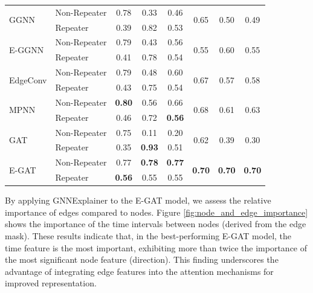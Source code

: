 \documentclass[journal]{IEEEtran}
\begin{document}
\begin{table}[htbp]
{\begin{tabular}{l l | c c c | c c c}
            \multirow{2}{*}{GGNN} 
                & Non-Repeater    & 0.78 & 0.33 & 0.46 & \multirow{2}{*}{0.65} & \multirow{2}{*}{0.50} & \multirow{2}{*}{0.49} \\
                & Repeater        & 0.39 & 0.82 & 0.53 &  &  &  \\
            \midrule
            \multirow{2}{*}{E-GGNN} 
                & Non-Repeater    & 0.79 & 0.43 & 0.56 & \multirow{2}{*}{0.55} & \multirow{2}{*}{0.60} & \multirow{2}{*}{0.55} \\
                & Repeater        & 0.41 & 0.78 & 0.54 &  &  &  \\
            \midrule 
            \multirow{2}{*}{EdgeConv} 
                & Non-Repeater    & 0.79 & 0.48 & 0.60 & \multirow{2}{*}{0.67} & \multirow{2}{*}{0.57} & \multirow{2}{*}{0.58} \\
                & Repeater        & 0.43 & 0.75 & 0.54 &  &  &  \\
            \midrule
            \multirow{2}{*}{MPNN} 
                & Non-Repeater    & \textbf{0.80} & 0.56 & 0.66 & \multirow{2}{*}{0.68} & \multirow{2}{*}{0.61} & \multirow{2}{*}{0.63} \\
                & Repeater        & 0.46 & 0.72 & \textbf{0.56} &  &  &  \\
            \midrule
            \multirow{2}{*}{GAT} 
                & Non-Repeater    & 0.75 & 0.11 & 0.20 & \multirow{2}{*}{0.62} & \multirow{2}{*}{0.39} & \multirow{2}{*}{0.30} \\
                & Repeater        & 0.35 & \textbf{0.93} & 0.51 &  &  &  \\
            \midrule
            \multirow{2}{*}{E-GAT} 
                & Non-Repeater    & 0.77 & \textbf{0.78} & \textbf{0.77} & \multirow{2}{*}{\textbf{0.70}} & \multirow{2}{*}{\textbf{0.70}} & \multirow{2}{*}{\textbf{0.70}} \\
                & Repeater        & \textbf{0.56} & 0.55 & 0.55 & & & \\
            \bottomrule
        \end{tabular}}
\end{table}

By applying GNNExplainer to the E-GAT model, we assess the relative importance of edges compared to nodes. Figure \ref{fig:node_and_edge_importance} shows the importance of the time intervals between nodes (derived from the edge mask). These results indicate that, in the best-performing E-GAT model, the time feature is the most important, exhibiting more than twice the importance of the most significant node feature (direction). This finding underscores the advantage of integrating edge features into the attention mechanisms for improved representation.
\end{document}
